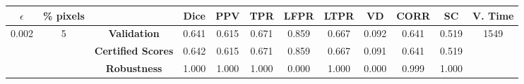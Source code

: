 \begin{longtable}{ c  c | c | c  c  c  c  c  c  c c c}
\toprule \textbf{$\epsilon$} & \textbf{\% pixels} & & \textbf{Dice} & \textbf{PPV} & \textbf{TPR} & \textbf{LFPR} & \textbf{LTPR} & \textbf{VD} & \textbf{CORR} & \textbf{SC} & \textbf{V. Time} \\
\midrule 
\multirow{3}{*}{0.002}  & \multirow{3}{*}{5} &\textbf{Validation} & 0.641 & 0.615 & 0.671 & 0.859 & 0.667 & 0.092 & 0.641 & 0.519 & \multirow{3}{*}{1549} \\
 & & \textbf{Certified Scores} & 0.642 & 0.615 & 0.671 & 0.859 & 0.667 & 0.091 & 0.641 & 0.519 & \\
& & \textbf{Robustness} & 1.000 & 1.000 & 1.000 & 0.000 & 1.000 & 0.000 & 0.999 & 1.000 & \\
\end{longtable}